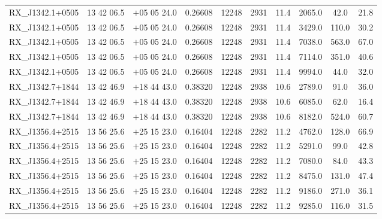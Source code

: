\begin{landscape}
\begin{center}
\begin{longtable}{l c c c c c c c c c}
RX\_J1342.1+0505  &        13 42 06.5  &         $+$05 05 24.0  &       0.26608  & 12248  &   2931  &       11.4  &      2065.0  &  42.0  &   21.8  \\
RX\_J1342.1+0505  &        13 42 06.5  &         $+$05 05 24.0  &       0.26608  & 12248  &   2931  &       11.4  &      3429.0  &  110.0  &  30.2  \\
RX\_J1342.1+0505  &        13 42 06.5  &         $+$05 05 24.0  &       0.26608  & 12248  &   2931  &       11.4  &      7038.0  &  563.0  &  67.0  \\
RX\_J1342.1+0505  &        13 42 06.5  &         $+$05 05 24.0  &       0.26608  & 12248  &   2931  &       11.4  &      7114.0  &  351.0  &  40.6  \\
RX\_J1342.1+0505  &        13 42 06.5  &         $+$05 05 24.0  &       0.26608  & 12248  &   2931  &       11.4  &      9994.0  &  44.0  &   32.0  \\
RX\_J1342.7+1844  &        13 42 46.9  &         $+$18 44 43.0  &       0.38320  & 12248  &   2938  &       10.6  &      2789.0  &  91.0  &   36.0  \\
RX\_J1342.7+1844  &        13 42 46.9  &         $+$18 44 43.0  &       0.38320  & 12248  &   2938  &       10.6  &      6085.0  &  62.0  &   16.4  \\
RX\_J1342.7+1844  &        13 42 46.9  &         $+$18 44 43.0  &       0.38320  & 12248  &   2938  &       10.6  &      8182.0  &  524.0  &  60.7  \\
RX\_J1356.4+2515  &        13 56 25.6  &         $+$25 15 23.0  &       0.16404  & 12248  &   2282  &       11.2  &      4762.0  &  128.0  &  66.9  \\
RX\_J1356.4+2515  &        13 56 25.6  &         $+$25 15 23.0  &       0.16404  & 12248  &   2282  &       11.2  &      5291.0  &  99.0  &   42.8  \\
RX\_J1356.4+2515  &        13 56 25.6  &         $+$25 15 23.0  &       0.16404  & 12248  &   2282  &       11.2  &      7080.0  &  84.0  &   43.3  \\
RX\_J1356.4+2515  &        13 56 25.6  &         $+$25 15 23.0  &       0.16404  & 12248  &   2282  &       11.2  &      8475.0  &  131.0  &  47.4  \\
RX\_J1356.4+2515  &        13 56 25.6  &         $+$25 15 23.0  &       0.16404  & 12248  &   2282  &       11.2  &      9186.0  &  271.0  &  36.1  \\
RX\_J1356.4+2515  &        13 56 25.6  &         $+$25 15 23.0  &       0.16404  & 12248  &   2282  &       11.2  &      9285.0  &  116.0  &  31.5  \\

\end{longtable}
\end{center}
\end{landscape}
